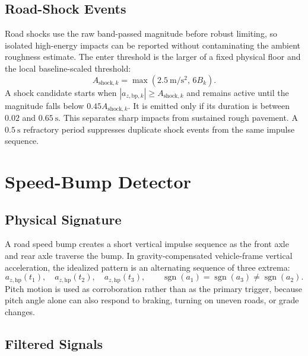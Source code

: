 \documentclass[11pt]{article}
\newcommand{\abs}[1]{\left|#1\right|}
\newcommand{\sgn}{\operatorname{sgn}}
\begin{document}
\subsection{Road-Shock Events}

Road shocks use the raw band-passed magnitude before robust limiting, so
isolated high-energy impacts can be reported without contaminating the ambient
roughness estimate. The enter threshold is the larger of a fixed physical floor
and the local baseline-scaled threshold:
\begin{equation}
  A_{\mathrm{shock},k}
  = \max\left(2.5~\mathrm{m/s^2},\,6B_k\right).
\end{equation}
A shock candidate starts when
\(\abs{a_{z,\mathrm{bp},k}}\ge A_{\mathrm{shock},k}\) and remains active until
the magnitude falls below \(0.45A_{\mathrm{shock},k}\). It is emitted only if
its duration is between \(0.02\) and \(0.65~\mathrm{s}\). This separates sharp
impacts from sustained rough pavement. A \(0.5~\mathrm{s}\) refractory period
suppresses duplicate shock events from the same impulse sequence.

\section{Speed-Bump Detector}

\subsection{Physical Signature}

A road speed bump creates a short vertical impulse sequence as the front axle
and rear axle traverse the bump. In gravity-compensated vehicle-frame vertical
acceleration, the idealized pattern is an alternating sequence of three extrema:
\begin{equation}
  a_{z,\mathrm{hp}}(t_1),\quad a_{z,\mathrm{hp}}(t_2),\quad a_{z,\mathrm{hp}}(t_3),
  \qquad
  \sgn(a_1)=\sgn(a_3)\ne\sgn(a_2).
\end{equation}
Pitch motion is used as corroboration rather than as the primary trigger,
because pitch angle alone can also respond to braking, turning on uneven roads,
or grade changes.

\subsection{Filtered Signals}
\end{document}
